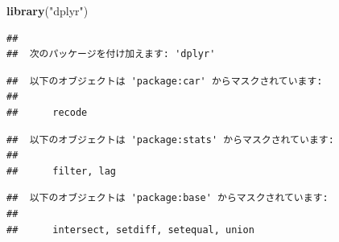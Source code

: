 \documentclass[]{book}
\newenvironment{Shaded}{\begin{snugshade}}{\end{snugshade}}
\newcommand{\KeywordTok}[1]{\textcolor[rgb]{0.13,0.29,0.53}{\textbf{#1}}}
\newcommand{\StringTok}[1]{\textcolor[rgb]{0.31,0.60,0.02}{#1}}
\newcommand{\NormalTok}[1]{#1}
\begin{document}
\begin{Shaded}
\begin{Highlighting}[]
\KeywordTok{library}\NormalTok{(}\StringTok{"dplyr"}\NormalTok{)}
\end{Highlighting}
\end{Shaded}

\begin{verbatim}
## 
##  次のパッケージを付け加えます: 'dplyr'
\end{verbatim}

\begin{verbatim}
##  以下のオブジェクトは 'package:car' からマスクされています: 
## 
##      recode
\end{verbatim}

\begin{verbatim}
##  以下のオブジェクトは 'package:stats' からマスクされています: 
## 
##      filter, lag
\end{verbatim}

\begin{verbatim}
##  以下のオブジェクトは 'package:base' からマスクされています: 
## 
##      intersect, setdiff, setequal, union
\end{verbatim}
\end{document}
